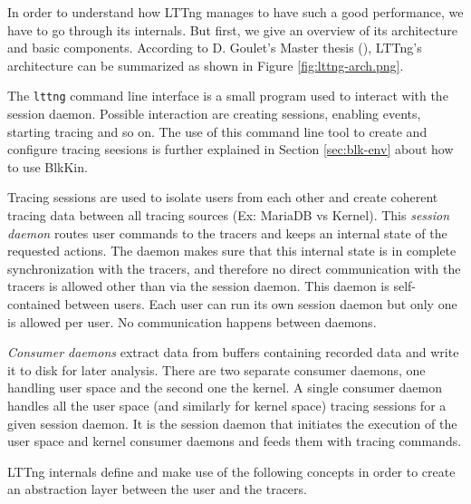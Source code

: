 In order to understand how LTTng manages to have such a good performance, we
have to go through its internals. But first, we give an overview of its
architecture and basic components. According to D. Goulet's Master thesis
(\cite{goulet}), LTTng's architecture can be summarized as shown in Figure
\ref{fig:lttng-arch.png}.  


The \texttt{lttng} command line interface is a small program used to interact
with the session daemon. Possible interaction are creating sessions, enabling
events, starting tracing and so on. The use of this command line tool to create
and configure tracing seesions is further explained in Section
\ref{sec:blk-env} about how to use BlkKin.

Tracing sessions are used to isolate users from each other and create coherent
tracing data between all tracing sources (Ex: MariaDB vs Kernel). This
\textit{session daemon} routes user commands to the tracers and keeps an
internal state of the requested actions. The daemon makes sure that this
internal state is in complete synchronization with the tracers, and therefore no
direct communication with the tracers is allowed other than via the session
daemon.  This daemon is self-contained between users. Each user can run its own
session daemon but only one is allowed per user. No communication happens
between daemons. 

\textit{Consumer daemons} extract data from buffers containing recorded data and
write it to disk for later analysis. There are two separate consumer daemons,
one handling user space and the second one the kernel. A single consumer daemon
handles all the user space (and similarly for kernel space) tracing sessions for
a given session daemon. It is the session daemon that initiates the execution of
the user space and kernel consumer daemons and feeds them with tracing commands.

LTTng internals define and make use of the following concepts in order to create
an abstraction layer between the user and the tracers.
 
